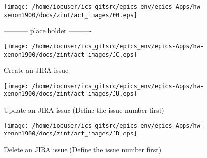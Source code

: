 \noindent
\vspace{1.4cm}
\begin{minipage}{.2\textwidth}
\begin{center}
\texttt{[image: /home/iocuser/ics\_gitsrc/epics\_env/epics-Apps/hw-xenon1900/docs/zint/act\_images/00.eps]}
\end{center}
\end{minipage}
\begin{minipage}{.7\textwidth}
----------- place holder ----------
\end{minipage}


\noindent
\vspace{1.4cm}
\begin{minipage}{.2\textwidth}
\begin{center}
\texttt{[image: /home/iocuser/ics\_gitsrc/epics\_env/epics-Apps/hw-xenon1900/docs/zint/act\_images/JC.eps]}
\end{center}
\end{minipage}
\begin{minipage}{.7\textwidth}
Create an JIRA issue 
\end{minipage}


\noindent
\vspace{1.4cm}
\begin{minipage}{.2\textwidth}
\begin{center}
\texttt{[image: /home/iocuser/ics\_gitsrc/epics\_env/epics-Apps/hw-xenon1900/docs/zint/act\_images/JU.eps]}
\end{center}
\end{minipage}
\begin{minipage}{.7\textwidth}
Update an JIRA issue (Define the issue number first)
\end{minipage}


\noindent
\vspace{1.4cm}
\begin{minipage}{.2\textwidth}
\begin{center}
\texttt{[image: /home/iocuser/ics\_gitsrc/epics\_env/epics-Apps/hw-xenon1900/docs/zint/act\_images/JD.eps]}
\end{center}
\end{minipage}
\begin{minipage}{.7\textwidth}
Delete an JIRA issue (Define the issue number first)
\end{minipage}


